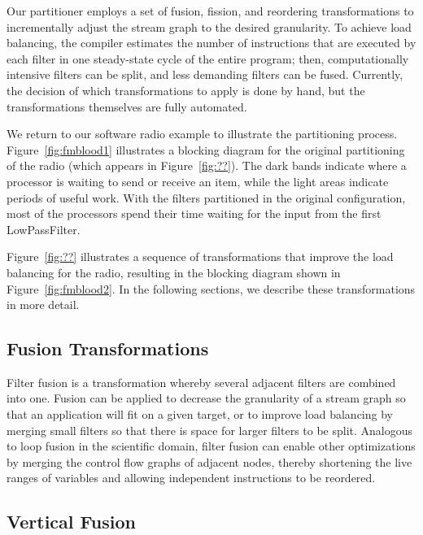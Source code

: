 Our partitioner employs a set of fusion, fission, and reordering
transformations to incrementally adjust the stream graph to the
desired granularity.  To achieve load balancing, the compiler
estimates the number of instructions that are executed by each filter
in one steady-state cycle of the entire program; then, computationally
intensive filters can be split, and less demanding filters can be
fused.  Currently, the decision of which transformations to apply is
done by hand, but the transformations themselves are fully automated.

We return to our software radio example to illustrate the partitioning
process.  Figure~\ref{fig:fmblood1} illustrates a blocking diagram for
the original partitioning of the radio (which appears in
Figure~\ref{fig:??}).  The dark bands indicate where a processor is
waiting to send or receive an item, while the light areas indicate
periods of useful work.  With the filters partitioned in the original
configuration, most of the processors spend their time waiting for the
input from the first LowPassFilter.

Figure~\ref{fig:??} illustrates a sequence of transformations that
improve the load balancing for the radio, resulting in the blocking
diagram shown in Figure~\ref{fig:fmblood2}.   In the following sections, we describe these
transformations in more detail.


\subsection{Fusion Transformations}

Filter fusion is a transformation whereby several adjacent filters are
combined into one.  Fusion can be applied to decrease the granularity
of a stream graph so that an application will fit on a given target,
or to improve load balancing by merging small filters so that there is
space for larger filters to be split.  Analogous to loop fusion in the
scientific domain, filter fusion can enable other optimizations by
merging the control flow graphs of adjacent nodes, thereby shortening
the live ranges of variables and allowing independent instructions to
be reordered.

\subsection{Vertical Fusion}

